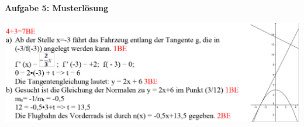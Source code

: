 \documentclass[a4paper,12pt]{article}
\newcommand{\Aufgabe}[1]{
  {
  \vspace*{0.5cm}
  \textsf{\textbf{Aufgabe #1}}
  \vspace*{0.2cm}
  
  }
}
\begin{document}
\newpage
\Aufgabe{5: Musterlösung}
\includegraphics[width=\linewidth]{Q11_1KlausurJanuar2022_ml5.png}


\end{document}
